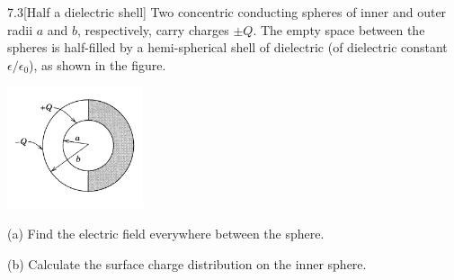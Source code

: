 \documentclass[12pt]{article}
\begin{document}
\begin{problem}{7.3}[Half a dielectric shell]
Two concentric conducting spheres of inner and outer radii $a$ and $b$,
respectively, carry charges $\pm Q$. The empty space between the spheres is
half-filled by a hemi-spherical shell of dielectric (of dielectric constant
$\epsilon /\epsilon_0$), as shown in the figure.

\begin{center}
    \includegraphics[width=0.3\textwidth]{hw7_p3.jpg} 
\end{center}

(a) Find the electric field everywhere between the sphere.

(b) Calculate the surface charge distribution on the inner sphere.


\end{problem}
\end{document}
